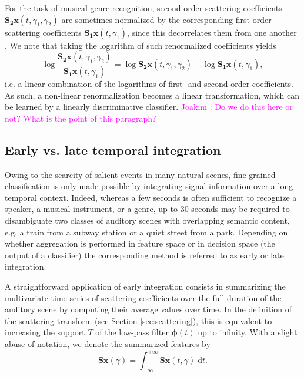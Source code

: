 \documentclass[journal]{IEEEtran}
\makeatletter
\newcommand*{\eg}{e.g.\@\xspace}
\newcommand*{\ie}{i.e.\@\xspace}
\newcommand*{\vs}{vs.\@\xspace}
\newcommand{\ja}[1]{\textcolor{magenta}{Joakim : #1}}
\makeatother
\begin{document}
For the task of musical genre recognition, second-order scattering coefficients $\mathbf{S_2}\boldsymbol{x}(t,\gamma_1,\gamma_2)$ are sometimes normalized by the corresponding first-order scattering coefficients $\mathbf{S_1}\boldsymbol{x}(t,\gamma_1)$, since this decorrelates them from one another \cite{Anden2014}.
We note that taking the logarithm of such renormalized coefficients yields
\begin{equation}
\log \dfrac{\mathbf{S_2}\boldsymbol{x}(t,\gamma_1,\gamma_2)}{\mathbf{S_1}\boldsymbol{x}(t,\gamma_1)} =
\log \mathbf{S_2}\boldsymbol{x}(t, \gamma_1, \gamma_2) -
\log \mathbf{S_1}\boldsymbol{x}(t, \gamma_1),
\end{equation}
\ie a linear combination of the logarithms of first- and second-order coefficients.
As such, a non-linear renormalization becomes a linear transformation, which can be learned by a linearly discriminative classifier. \ja{Do we do this here or not? What is the point of this paragraph?}

\subsection{Early \vs late temporal integration}
\label{sec:eili}

Owing to the scarcity of salient events in many natural scenes,
fine-grained classification is only made
possible by integrating signal information over a long temporal context.
Indeed, whereas a few seconds is often sufficient to recognize a speaker,
a musical instrument, or a genre, up to $30$ seconds may be required
to disambiguate two classes of auditory scenes with overlapping semantic content, \eg a train from a subway station or a quiet street from a park.
Depending on whether aggregation is performed in feature space or in decision space (the output of a classifier) the corresponding method is referred to as early or late integration.

A straightforward application of early integration consists in summarizing the multivariate time series of scattering coefficients over the full duration of the auditory scene by computing their average values over time.
In the definition of the scattering transform (see Section \ref{sec:scattering}), this is equivalent to increasing the support $T$ of the low-pass filter $\boldsymbol{\phi}(t)$ up to infinity. With a slight abuse of notation, we denote the summarized features by
\begin{equation}
\mathbf{S}\boldsymbol{x}(\gamma) =
\int_{-\infty}^{+\infty} \mathbf{S}\boldsymbol{x}(t,\gamma)\;\mathrm{d}t\mbox{.}
\end{equation}
\end{document}
